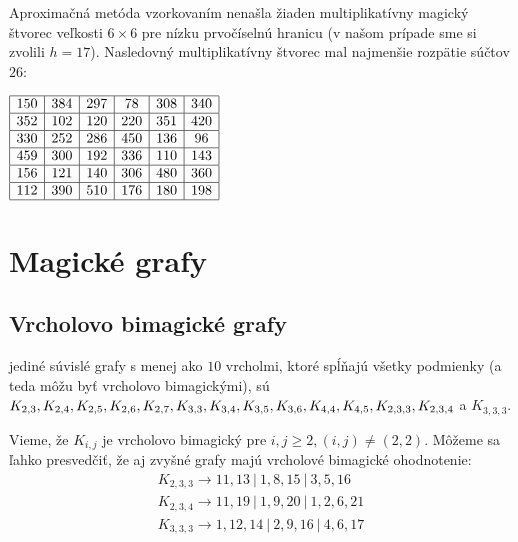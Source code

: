 \begin{result} Aproximačná metóda vzorkovaním nenašla žiaden multiplikatívny magický štvorec veľkosti $6 \times 6$ pre nízku prvočíselnú hranicu (v našom prípade sme si zvolili $h = 17$). Nasledovný multiplikatívny štvorec mal najmenšie rozpätie súčtov $26$:
\end{result}

\begin{center}
$\begin{array}{ |c|c|c|c|c|c| } 
\hline
150 & 384 & 297 & 78 & 308 & 340 \\ 
\hline
352 & 102 & 120 & 220 & 351 & 420 \\ 
\hline
330 & 252 & 286 & 450 & 136 & 96 \\ 
\hline
459 & 300 & 192 & 336 & 110 & 143 \\ 
\hline
156 & 121 & 140 & 306 & 480 & 360 \\ 
\hline
112 & 390 & 510 & 176 & 180 & 198 \\ 
\hline
\end{array}$
\end{center}


\section{Magické grafy}

\subsection{Vrcholovo bimagické grafy}
 
\begin{result} jediné súvislé grafy s menej ako $10$ vrcholmi, ktoré spĺňajú všetky podmienky (a teda môžu byť vrcholovo bimagickými), sú $K_{2,3}, K_{2,4}, K_{2,5}, K_{2,6}, K_{2,7}, K_{3,3}, \\
K_{3,4}, K_{3,5}, K_{3,6}, K_{4,4}, K_{4,5}, K_{2,3,3}, K_{2,3,4}$ a $K_{3,3,3}$.
\end{result}

Vieme, že $K_{i,j}$ je vrcholovo bimagický pre $i,j \geq 2, (i,j) \neq (2,2)$. Môžeme sa ľahko presvedčiť, že aj zvyšné grafy majú vrcholové bimagické ohodnotenie:
\begin{gather*}
K_{2,3,3} \rightarrow 11, 13 ~|~ 1, 8, 15 ~|~ 3, 5, 16 \\
K_{2,3,4} \rightarrow 11, 19 ~|~ 1, 9, 20 ~|~ 1, 2, 6, 21 \\
K_{3,3,3} \rightarrow 1, 12, 14 ~|~ 2, 9, 16 ~|~ 4, 6, 17
\end{gather*}

